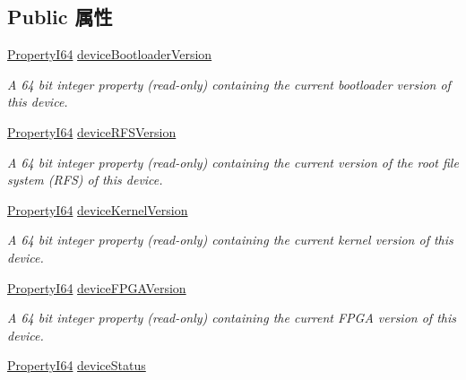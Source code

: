 \subsection*{Public 属性}
\begin{DoxyCompactItemize}
\item 
\hyperlink{group___common_interface_ga81749b2696755513663492664a18a893}{Property\+I64} \hyperlink{classmv_i_m_p_a_c_t_1_1acquire_1_1_info_blue_c_o_u_g_a_r_a5f15cc2b4482e0d993ca94e53c09ffc9}{device\+Bootloader\+Version}
\begin{DoxyCompactList}\small\item\em A 64 bit integer property {\bfseries }(read-\/only) containing the current bootloader version of this device. \end{DoxyCompactList}\item 
\hyperlink{group___common_interface_ga81749b2696755513663492664a18a893}{Property\+I64} \hyperlink{classmv_i_m_p_a_c_t_1_1acquire_1_1_info_blue_c_o_u_g_a_r_ad94804e931336b7f298d8a7e44b34117}{device\+R\+F\+S\+Version}
\begin{DoxyCompactList}\small\item\em A 64 bit integer property {\bfseries }(read-\/only) containing the current version of the root file system (R\+F\+S) of this device. \end{DoxyCompactList}\item 
\hyperlink{group___common_interface_ga81749b2696755513663492664a18a893}{Property\+I64} \hyperlink{classmv_i_m_p_a_c_t_1_1acquire_1_1_info_blue_c_o_u_g_a_r_ab6e99b60c4df4323352d9fb1e56a401e}{device\+Kernel\+Version}
\begin{DoxyCompactList}\small\item\em A 64 bit integer property {\bfseries }(read-\/only) containing the current kernel version of this device. \end{DoxyCompactList}\item 
\hyperlink{group___common_interface_ga81749b2696755513663492664a18a893}{Property\+I64} \hyperlink{classmv_i_m_p_a_c_t_1_1acquire_1_1_info_blue_c_o_u_g_a_r_af722482084c0e51f8e80b3641334977c}{device\+F\+P\+G\+A\+Version}
\begin{DoxyCompactList}\small\item\em A 64 bit integer property {\bfseries }(read-\/only) containing the current F\+P\+G\+A version of this device. \end{DoxyCompactList}\item 
\hyperlink{group___common_interface_ga81749b2696755513663492664a18a893}{Property\+I64} \hyperlink{classmv_i_m_p_a_c_t_1_1acquire_1_1_info_blue_c_o_u_g_a_r_a9a33e916adfcde0222bc2e376f437c46}{device\+Status}

\end{DoxyCompactItemize}
